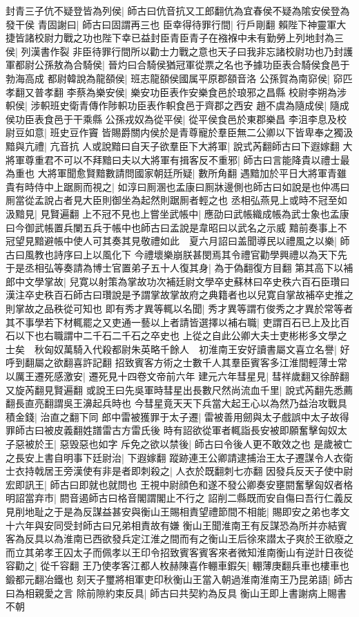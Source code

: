 封青三子伉不疑登皆為列侯|{
	師古曰伉音抗又工郎翻伉為宜春侯不疑為隂安侯登為發干侯}
青固謝曰|{
	師古曰固謂再三也}
臣幸得待罪行間|{
	行戶剛翻}
賴陛下神靈軍大捷皆諸校尉力戰之功也陛下幸已益封臣青臣青子在襁褓中未有勤勞上列地封為三侯|{
	列漢書作裂}
非臣待罪行間所以勸士力戰之意也天子曰我非忘諸校尉功也乃封護軍都尉公孫敖為合騎侯|{
	晉灼曰合騎侯猶冠軍從票之名也予據功臣表合騎侯食邑于勃海高成}
都尉韓說為龍頟侯|{
	班志龍頟侯國属平原郡頟音洛}
公孫賀為南窌侯|{
	窌匹孝翻又普孝翻}
李蔡為樂安侯|{
	樂安功臣表作安樂食邑於琅邪之昌縣}
校尉李朔為涉軹侯|{
	涉軹班史衛青傳作陟軹功臣表作軹食邑于齊郡之西安}
趙不虞為隨成侯|{
	隨成侯功臣表食邑于干乘縣}
公孫戎奴為從平侯|{
	從平侯食邑於東郡樂昌}
李沮李息及校尉豆如意|{
	班史豆作竇}
皆賜爵關内侯於是青尊寵於羣臣無二公卿以下皆卑奉之獨汲黯與亢禮|{
	亢音抗}
人或說黯曰自天子欲羣臣下大將軍|{
	說式芮翻師古曰下遐嫁翻}
大將軍尊重君不可以不拜黯曰夫以大將軍有揖客反不重邪|{
	師古曰言能降貴以禮士最為重也}
大將軍聞愈賢黯數請問國家朝廷所疑|{
	數所角翻}
遇黯加於平日大將軍青雖貴有時侍中上踞厠而視之|{
	如淳曰厠溷也孟康曰厠牀邊側也師古曰如說是也仲馮曰厠當從孟說占者見大臣則御坐為起然則踞厠者輕之也}
丞相弘燕見上或時不冠至如汲黯見|{
	見賢遍翻}
上不冠不見也上嘗坐武帳中|{
	應劭曰武帳織成帳為武士象也孟康曰今御武帳置兵闌五兵于帳中也師古曰孟說是韋昭曰以武名之示威}
黯前奏事上不冠望見黯避帳中使人可其奏其見敬禮如此　夏六月詔曰盖聞導民以禮風之以樂|{
	師古曰風教也詩序曰上以風化下}
今禮壞樂崩朕甚閔焉其令禮官勸學興禮以為天下先于是丞相弘等奏請為博士官置弟子五十人復其身|{
	為于偽翻復方目翻}
第其高下以補郎中文學掌故|{
	兒寛以射策為掌故功次補廷尉文學卒史蘇林曰卒史秩六百石臣瓚曰漢注卒史秩百石師古曰瓚說是予謂掌故掌故府之典籍者也以兒寛自掌故補卒史推之則掌故之品秩從可知也}
即有秀才異等輒以名聞|{
	秀才異等謂冇俊秀之才異於常等者}
其不事學若下材輒罷之又吏通一藝以上者請皆選擇以補右職|{
	吏謂百石已上及比百石以下也右職謂中二千石二千石之卒史也}
上從之自此公卿大夫士吏彬彬多文學之士矣　秋匈奴萬騎入代殺都尉朱英略千餘人　初淮南王安好讀書屬文喜立名譽|{
	好呼到翻屬之欲翻喜許記翻}
招致賓客方術之士數千人其羣臣賓客多江淮間輕薄士常以厲王遷死感激安|{
	遷死見十四卷文帝前六年}
建元六年彗星見|{
	彗祥歲翻又徐醉翻又旋芮翻見賢遍翻}
或說王曰先吳軍時彗星出長數尺然尚流血千里|{
	說式芮翻先悉薦翻長直亮翻謂吳王濞起兵時也}
今彗星竟天天下兵當大起王心以為然乃益治攻戰具積金錢|{
	治直之翻下同}
郎中雷被獲罪于太子遷|{
	雷被善用劒與太子戲誤中太子故得罪師古曰被皮義翻姓譜雷古方雷氏後}
時有詔欲從軍者輒詣長安被即願奮擊匈奴太子惡被於王|{
	惡毁惡也如字}
斥免之欲以禁後|{
	師古曰令後人更不敢效之也}
是歲被亡之長安上書自明事下廷尉治|{
	下遐嫁翻}
蹤跡連王公卿請逮捕治王太子遷謀令人衣衛士衣持戟居王旁漢使有非是者即刺殺之|{
	人衣於既翻刺七亦翻}
因發兵反天子使中尉宏即訊王|{
	師古曰即就也就問也}
王視中尉顔色和遂不發公卿奏安壅閼奮擊匈奴者格明詔當弃市|{
	閼音遏師古曰格音閣謂閣止不行之}
詔削二縣既而安自傷曰吾行仁義反見削地耻之于是為反謀益甚安與衡山王賜相責望禮節間不相能|{
	賜即安之弟也孝文十六年與安同受封師古曰兄弟相責故有嫌}
衡山王聞淮南王有反謀恐為所并亦結賓客為反具以為淮南已西欲發兵定江淮之間而有之衡山王后徐來譛太子爽於王欲廢之而立其弟孝王囚太子而佩孝以王印令招致賓客賓客來者微知淮南衡山有逆計日夜從容勸之|{
	從千容翻}
王乃使孝客江都人枚赫陳喜作輣車鍜矢|{
	輣薄庚翻兵車也樓車也鍛都元翻冶鐵也}
刻天子璽將相軍吏印秋衡山王當入朝過淮南淮南王乃昆弟語|{
	師古曰為相親愛之言}
除前隙約束反具|{
	師古曰共契約為反具}
衡山王即上書謝病上賜書不朝

